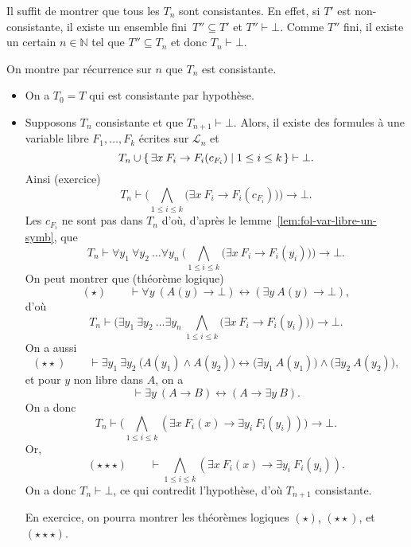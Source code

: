 \documentclass[./main]{subfiles}
\begin{document}
\begin{prv}
    Il suffit de montrer que tous les $T_n$ sont consistantes.
    En effet, si $T'$ est non-consistante, il existe un ensemble fini~$T'' \subseteq T'$ et $T'' \vdash \bot$. Comme $T''$ fini, il existe un certain $n \in \mathds{N}$ tel que $T'' \subseteq T_n$ et donc $T_n \vdash \bot$.

    On montre par récurrence sur $n$ que $T_n$ est consistante.
    \begin{itemize}
      \item On a $T_0 = T$ qui est consistante par hypothèse.
      \item Supposons $T_n$ consistante et que $T_{n+1} \vdash \bot$.
        Alors, il existe des formules à une variable libre $F_1, \ldots, F_k$ écrites sur $\mathcal{L}_n$ et 
        \[
        T_n \cup \mleft\{\,\exists x \: F_i \to F_i(c_{F_i}) \;\middle|\; 1 \le i \le k\,\mright\} \vdash \bot
        .\]
        Ainsi (exercice) \[
        T_n \vdash \Big( \bigwedge_{1 \le i \le k} \big(\exists x \: F_i \to F_i(c_{F_i})\big) \Big) \to \bot
        .\]
        Les $c_{F_i}$ ne sont pas dans $T_n$ d'où, d'après le lemme~\ref{lem:fol-var-libre-un-symb}, que \[
        T_n \vdash \forall y_1 \: \forall y_2 \: \ldots \forall y_n \: \Big( \bigwedge_{1 \le i \le k} \big(\exists x \: F_i \to F_i(y_i)\big) \Big) \to \bot
        .\]
        On peut montrer que (théorème logique)
        \[
          (\star) \quad\quad \vdash \forall y \: (A(y) \to \bot) \leftrightarrow (\exists y \: A(y) \to \bot)
        ,\]
        d'où
        \[
        T_n \vdash \Big(\exists y_1 \: \exists y_2 \: \ldots \exists y_n \: \bigwedge_{1 \le i \le k} \big(\exists x \: F_i \to F_i(y_i)\big) \Big) \to \bot
        .\]
        On a aussi \[
          (\star\star) \quad\quad
          \vdash \exists y_1 \: \exists y_2 \: \big( A(y_1) \land A(y_2)\big) \leftrightarrow
          \big(\exists y_1 \: A(y_1)\big) \land \big(\exists y_2 \: A(y_2)\big)
        ,\]
        et pour $y$ non libre dans $A$, on a \[
        \vdash \exists y \: (A \to B) \leftrightarrow (A \to \exists y \: B)
        .\]
        On a donc \[
        T_n \vdash \Big( \bigwedge_{1 \le i \le k} (\exists x \: F_i(x) \to \exists y_i \: F_i(y_i)) \Big) \to \bot
        .\]
        Or, \[
          (\star{\star}\star) \quad\quad \vdash \bigwedge_{1 \le i \le k} (\exists x \: F_i(x) \to \exists y_i \: F_i(y_i))
        .\]
        On a donc $T_n \vdash \bot$, ce qui contredit l'hypothèse, d'où $T_{n+1}$ consistante.

        En exercice, on pourra montrer les théorèmes logiques $(\star)$,  $(\star\star)$, et  $(\star{\star}\star)$.
    \end{itemize}
  \end{prv}
\end{document}
